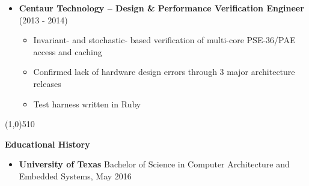 \documentclass{report}
\newcommand{\cut}{\begin{center} \line(1,0){510} \end{center}}
\begin{document}
\begin{itemize}[label=$\cdot$]
\item \textbf{Centaur Technology -- Design \& Performance Verification Engineer} (2013 - 2014)
  \begin{itemize}[label=$\circ$]
  \item Invariant- and stochastic- based verification of multi-core PSE-36/PAE access and caching
  \item Confirmed lack of hardware design errors through 3 major architecture releases
  \item Test harness written in Ruby
  \end{itemize}

\end{itemize}

\cut{}

\textbf{Educational History}
\begin{itemize}[label=$\cdot$]
\item \textbf{University of Texas} Bachelor of Science in Computer Architecture and Embedded Systems, May 2016
\end{itemize}
\end{document}
